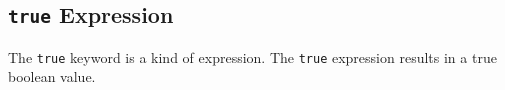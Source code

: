 
\subsection{\texttt{true} Expression}
{
	The \texttt{true} keyword is a kind of expression.
	The \texttt{true} expression results in a true boolean value.
}
